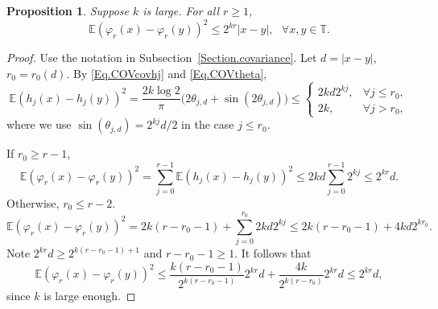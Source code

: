 \documentclass[11pt]{article}
\newtheorem{prop}[theorem]{Proposition}
\theoremstyle{definition}
\def \E {{\mathbb{E}}}
\def \T {{\mathbb{T}}}
\begin{document}
 \begin{prop} \label{Prop.smooth}
Suppose $k$ is large. For all $r \ge 1$,
 $$
\E (\varphi_r (x) - \varphi_r (y))^2 \le 2^{kr} |x-y|, \ \ \ \forall x, y \in \T.
 $$
  \end{prop}
 \begin{proof}
Use the notation in Subsection~\ref{Section.covariance}. Let $d = |x-y|$, $r_0 = r_0 (d)$. By \eqref{Eq.COVcovhj} and \eqref{Eq.COVtheta},
 $$
\E (h_j (x) - h_j (y))^2 =
\frac {2k \log 2} \pi
  \big( 2 \theta_{j , d} +  \sin (2 \theta_{j , d} ))
  \le \left\{ \begin{array}{ll} 2 k d 2^{k j} , &  \forall j \le r_0 , \\ 2 k , & \forall j > r_0 , \end{array} \right.
 $$
where we use $\sin (\theta_{j,d}) = 2^{kj} d / 2$ in the case $j \le r_0$.

If $r_0 \ge r-1 $,
 $$
\E (\varphi_r (x) - \varphi_r (y))^2 = \sum_{j =0}^{r-1} \E (h_j (x) - h_j (y))^2 \le 2kd \sum_{j =0}^{r-1} 2^{kj} \le 2^{kr} d.
 $$
Otherwise, $r_0 \le r - 2$.
 $$
\E (\varphi_r (x) - \varphi_r (y))^2 = 2 k (r - r_0 - 1) + \sum_{j =0}^{r_0} 2 k d 2^{kj} \le 2 k (r - r_0 - 1) + 4kd 2^{k r_0} .
 $$
Note $2^{kr} d \ge 2^{k(r-r_0 -1) + 1}$ and $r - r_0 - 1 \ge 1$. It follows that
 $$
\E (\varphi_r (x) - \varphi_r (y))^2 \le \frac {k(r - r_0 - 1)} {2^{k (r-r_0 - 1)}} 2^{kr} d  +    \frac {4k}{ 2^{k (r-r_0)}} 2^{kr} d \le 2^{kr} d ,
 $$
since $k$ is large enough.
\end{proof}
\end{document}
